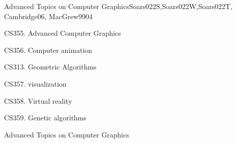 \begin{syllabus}
\begin{unit}{Advanced Topics on Computer Graphics}{}{Soars022S,Soars022W,Soars022T, Cambridge06, MacGrew99}{0}{4}
   \begin{topics}
      \item CS355. Advanced Computer Graphics
      \item CS356. Computer animation
      \item CS313. Geometric Algorithms
      \item CS357. visualization
      \item CS358. Virtual reality
      \item CS359. Genetic algorithms
   \end{topics}

   \begin{learningoutcomes}
      \item Advanced Topics on Computer Graphics
   \end{learningoutcomes}
\end{unit}

\begin{coursebibliography}
\end{coursebibliography}

\end{syllabus}
